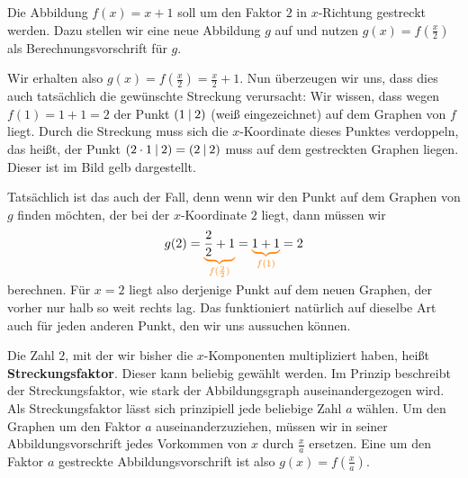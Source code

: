 \documentclass[../../main.tex]{subfiles}
\begin{document}
\begin{example}{}

    Die Abbildung $f(x)=x+1$ soll um den Faktor $2$ in $x$-Richtung gestreckt werden. Dazu stellen wir eine neue Abbildung $g$ auf und nutzen $g(x)=f(\frac{x}{2})$ als Berechnungsvorschrift für $g$.
    
    Wir erhalten also $g(x)=f(\frac{x}{2})=\frac{x}{2}+1$. Nun überzeugen wir uns, dass dies auch tatsächlich die gewünschte Streckung verursacht: Wir wissen, dass wegen $f(1)=1+1=2$ der Punkt $\left(1 \:\middle|\: 2\right)$ (weiß eingezeichnet) auf dem Graphen von $f$ liegt. Durch die Streckung muss sich die $x$-Koordinate dieses Punktes verdoppeln, das heißt, der Punkt $\left(2\cdot 1 \:\middle|\: 2\right)=\left(2 \:\middle|\: 2\right)$ muss auf dem gestreckten Graphen liegen. Dieser ist im Bild gelb dargestellt.
    
    Tatsächlich ist das auch der Fall, denn wenn wir den Punkt auf dem Graphen von $g$ finden möchten, der bei der $x$-Koordinate $2$ liegt, dann müssen wir
    \[g(2)=\colorbrace{\frac{2}{2}+1}{f(\frac{2}{2})}=\colorbrace{1+1}{f(1)}=2\] 
    berechnen. Für $x=2$ liegt also derjenige Punkt auf dem neuen Graphen, der vorher nur halb so weit rechts lag. Das funktioniert natürlich auf dieselbe Art auch für jeden anderen Punkt, den wir uns aussuchen können.
\end{example}

Die Zahl $2$, mit der wir bisher die $x$-Komponenten multipliziert haben, heißt \textbf{Streckungsfaktor}. Dieser kann beliebig gewählt werden. Im Prinzip beschreibt der Streckungsfaktor, wie stark der Abbildungsgraph auseinandergezogen wird. Als Streckungsfaktor lässt sich prinzipiell jede beliebige Zahl $a$ wählen. Um den Graphen um den Faktor $a$ auseinanderzuziehen, müssen wir in seiner Abbildungsvorschrift jedes Vorkommen von $x$ durch $\frac{x}{a}$ ersetzen. Eine um den Faktor $a$ gestreckte Abbildungsvorschrift ist also $g(x)=f(\frac{x}{a})$.
\end{document}
